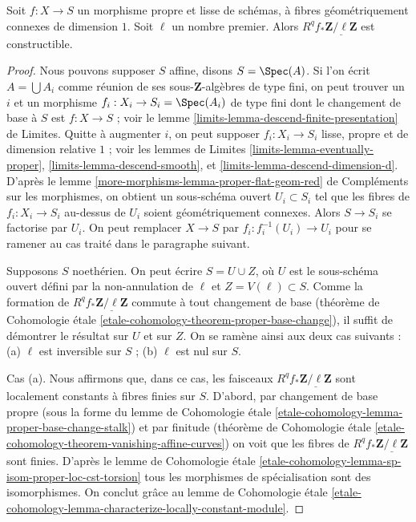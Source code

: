 \begin{lemma}
\label{lemma-proper-smooth-family-curves}
Soit $f : X \to S$ un morphisme propre et lisse de schémas, à
fibres géométriquement connexes de dimension $1$. Soit $\ell$
un nombre premier. Alors $R^qf_*\underline{\mathbf{Z}/\ell\mathbf{Z}}$
est constructible.
\end{lemma}

\begin{proof}
Nous pouvons supposer $S$ affine, disons $S = \Spec(A)$. Si l'on écrit
$A = \bigcup A_i$ comme réunion de ses sous-$\mathbf{Z}$-algèbres de type fini,
on peut trouver un $i$ et un morphisme $f_i : X_i \to S_i = \Spec(A_i)$ de type
fini dont le changement de base à $S$ est $f : X \to S$ ; voir le
lemme \ref{limits-lemma-descend-finite-presentation} de Limites.
Quitte à augmenter $i$, on peut supposer $f_i : X_i \to S_i$
lisse, propre et de dimension relative $1$ ; voir les
lemmes de Limites
\ref{limits-lemma-eventually-proper},
\ref{limits-lemma-descend-smooth}, et
\ref{limits-lemma-descend-dimension-d}.
D'après le lemme \ref{more-morphisms-lemma-proper-flat-geom-red} de Compléments sur les morphismes,
on obtient un sous-schéma ouvert $U_i \subset S_i$ tel que les fibres
de $f_i : X_i \to S_i$ au-dessus de $U_i$ soient géométriquement connexes.
Alors $S \to S_i$ se factorise par $U_i$. On peut remplacer $X \to S$
par $f_i : f_i^{-1}(U_i) \to U_i$ pour se ramener au cas
traité dans le paragraphe suivant.

\medskip\noindent
Supposons $S$ noethérien. On peut écrire $S = U \cup Z$, où $U$ est le
sous-schéma ouvert défini par la non-annulation de $\ell$ et
$Z = V(\ell) \subset S$. Comme la formation de
$R^qf_*\underline{\mathbf{Z}/\ell\mathbf{Z}}$ commute à tout
changement de base (théorème de Cohomologie étale
\ref{etale-cohomology-theorem-proper-base-change}),
il suffit de démontrer le résultat sur $U$ et sur $Z$.
On se ramène ainsi aux deux cas suivants : (a) $\ell$
est inversible sur $S$ ; (b) $\ell$ est nul sur $S$.

\medskip\noindent
Cas (a). Nous affirmons que, dans ce cas, les faisceaux
$R^qf_*\underline{\mathbf{Z}/\ell\mathbf{Z}}$ sont
localement constants à fibres finies sur $S$. D'abord, par changement de base propre
(sous la forme du lemme de Cohomologie étale
\ref{etale-cohomology-lemma-proper-base-change-stalk})
et par finitude
(théorème de Cohomologie étale
\ref{etale-cohomology-theorem-vanishing-affine-curves})
on voit que les fibres de $R^qf_*\underline{\mathbf{Z}/\ell\mathbf{Z}}$
sont finies. D'après le lemme de Cohomologie étale
\ref{etale-cohomology-lemma-sp-isom-proper-loc-cst-torsion}
tous les morphismes de spécialisation sont des isomorphismes.
On conclut grâce au
lemme de Cohomologie étale
\ref{etale-cohomology-lemma-characterize-locally-constant-module}.


\end{proof}
